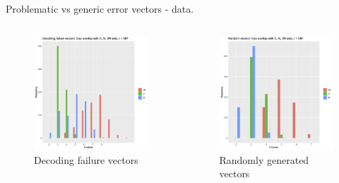 \begin{frame}{Problematic vs generic error vectors - data.}
\begin{columns}
    \begin{figure}
    \includegraphics[scale=.06]{Images/Rplot-587-df.png}
    \caption{Decoding failure vectors}
    \end{figure}
    
    \begin{figure}
    \includegraphics[scale=.06]{Images/Rplot-587-random.png}
    \caption{Randomly generated vectors}
    \end{figure}
\end{columns}


\end{frame}
